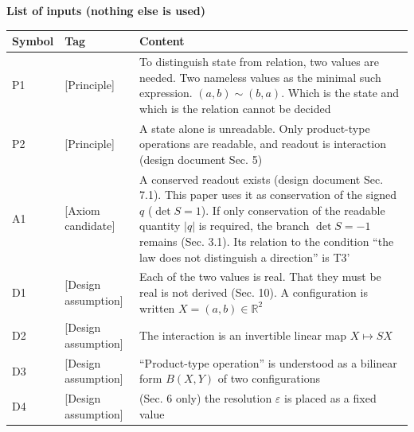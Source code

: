 \documentclass[
  a4paper,
]{article}
\newcounter{none} %
\begin{document}
\textbf{List of inputs (nothing else is used)}

{\def\LTcaptype{none} %
\begin{longtable}[]{@{}
  >{\raggedright\arraybackslash}p{}
  >{\raggedright\arraybackslash}p{}
  >{\raggedright\arraybackslash}p{}@{}}
\toprule\noalign{}
\begin{minipage}[b]{\linewidth}\raggedright
Symbol
\end{minipage} & \begin{minipage}[b]{\linewidth}\raggedright
Tag
\end{minipage} & \begin{minipage}[b]{\linewidth}\raggedright
Content
\end{minipage} \\
\midrule\noalign{}
\endhead
\bottomrule\noalign{}
\endlastfoot
P1 & {[}Principle{]} & To distinguish state from relation, two values
are needed. Two nameless values as the minimal such expression.
\((a,b)\sim(b,a)\). Which is the state and which is the relation cannot
be decided \\
P2 & {[}Principle{]} & A state alone is unreadable. Only product-type
operations are readable, and readout is interaction (design document
Sec. 5) \\
A1 & {[}Axiom candidate{]} & A conserved readout exists (design document
Sec. 7.1). This paper uses it as conservation of the signed \(q\)
(\(\det S=1\)). If only conservation of the readable quantity
\(\lvert q\rvert\) is required, the branch \(\det S=-1\) remains (Sec.
3.1). Its relation to the condition ``the law does not distinguish a
direction'' is T3' \\
D1 & {[}Design assumption{]} & Each of the two values is real. That they
must be real is not derived (Sec. 10). A configuration is written
\(X=(a,b)\in\mathbb R^2\) \\
D2 & {[}Design assumption{]} & The interaction is an invertible linear
map \(X\mapsto SX\) \\
D3 & {[}Design assumption{]} & ``Product-type operation'' is understood
as a bilinear form \(B(X,Y)\) of two configurations \\
D4 & {[}Design assumption{]} & (Sec. 6 only) the resolution
\(\varepsilon\) is placed as a fixed value \\
\end{longtable}
}
\end{document}
